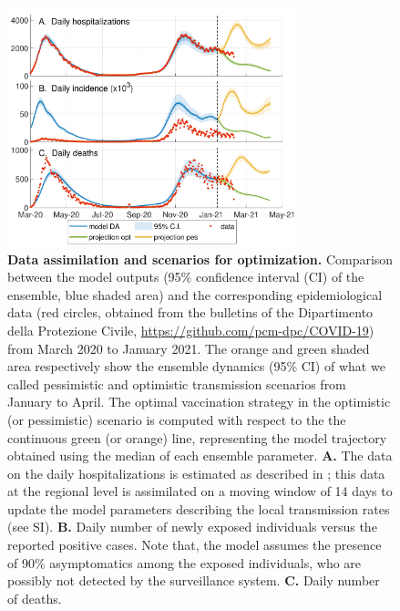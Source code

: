 \begin{figure}[!ht]
    \centering
    \includegraphics[width=0.75\textwidth]{fig_italy-ocp/figures/DA_italy1.pdf}
    \caption[Data assimilation and scenarios for optimization]{\textbf{Data assimilation and scenarios for optimization.
    } Comparison between the model outputs (95\% confidence interval (CI) of the ensemble, blue shaded area) and the corresponding epidemiological data (red circles, obtained from the bulletins of the Dipartimento della Protezione Civile, {\url{https://github.com/pcm-dpc/COVID-19}}) from March 2020 to January 2021. The orange and green shaded area respectively show the ensemble dynamics (95\% CI) of what we called pessimistic and optimistic transmission scenarios from January to April. The optimal vaccination strategy in the optimistic (or pessimistic) scenario is computed with respect to the the continuous green (or orange) line, representing the model trajectory obtained using the median of each ensemble parameter. \textbf{A.} The data on the daily hospitalizations is estimated as described in \parencite{Bertuzzo:GeographyCOVID19Spread:2020}; this data at the regional level is assimilated on a moving window of 14 days to update the model parameters describing the local transmission rates (see SI). 
    \textbf{B.} Daily number of newly exposed individuals versus the reported positive cases. Note that, the model assumes the presence of 90\% asymptomatics among the exposed individuals, who are possibly not detected by the surveillance system. \textbf{C.} Daily number of deaths. %
    }\label{fig:model_DA}
\end{figure}

